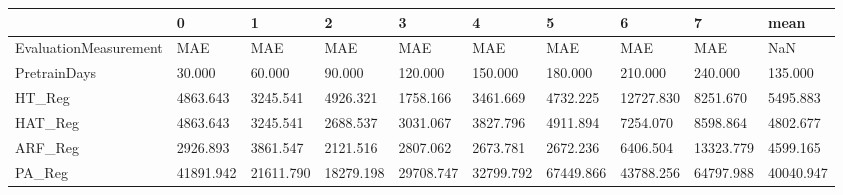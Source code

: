 \begin{tabular}{llllllllll}
\toprule
{} &         0 &         1 &         2 &         3 &         4 &         5 &         6 &         7 &      mean \\
\midrule
EvaluationMeasurement &       MAE &       MAE &       MAE &       MAE &       MAE &       MAE &       MAE &       MAE &       NaN \\
PretrainDays          &    30.000 &    60.000 &    90.000 &   120.000 &   150.000 &   180.000 &   210.000 &   240.000 &   135.000 \\
HT\_Reg                &  4863.643 &  3245.541 &  4926.321 &  1758.166 &  3461.669 &  4732.225 & 12727.830 &  8251.670 &  5495.883 \\
HAT\_Reg               &  4863.643 &  3245.541 &  2688.537 &  3031.067 &  3827.796 &  4911.894 &  7254.070 &  8598.864 &  4802.677 \\
ARF\_Reg               &  2926.893 &  3861.547 &  2121.516 &  2807.062 &  2673.781 &  2672.236 &  6406.504 & 13323.779 &  4599.165 \\
PA\_Reg                & 41891.942 & 21611.790 & 18279.198 & 29708.747 & 32799.792 & 67449.866 & 43788.256 & 64797.988 & 40040.947 \\
\bottomrule
\end{tabular}
